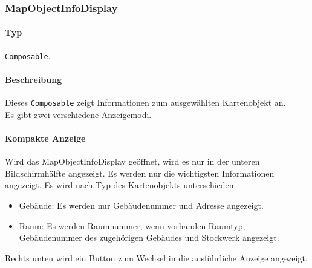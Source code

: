 \subsubsection{MapObjectInfoDisplay}\label{App_Map_View_MapObjectInfoDisplay}
\paragraph*{Typ}
\texttt{Composable}.
\paragraph*{Beschreibung}
Dieses \texttt{Composable} zeigt Informationen zum ausgewählten Kartenobjekt an.\\
Es gibt zwei verschiedene Anzeigemodi.

\paragraph*{Kompakte Anzeige}
Wird das MapObjectInfoDisplay geöffnet, wird es nur in der unteren Bildschirmhälfte angezeigt. 
Es werden nur die wichtigsten Informationen angezeigt. Es wird nach Typ des Kartenobjekts unterschieden:
\begin{itemize}
    \item Gebäude: Es werden nur Gebäudenummer und Adresse angezeigt.
    \item Raum: Es werden Raumnummer, wenn vorhanden Raumtyp, Gebäudenummer des zugehörigen Gebäudes und Stockwerk angezeigt.
\end{itemize}
Rechts unten wird ein Button zum Wechsel in die ausführliche Anzeige angezeigt.

